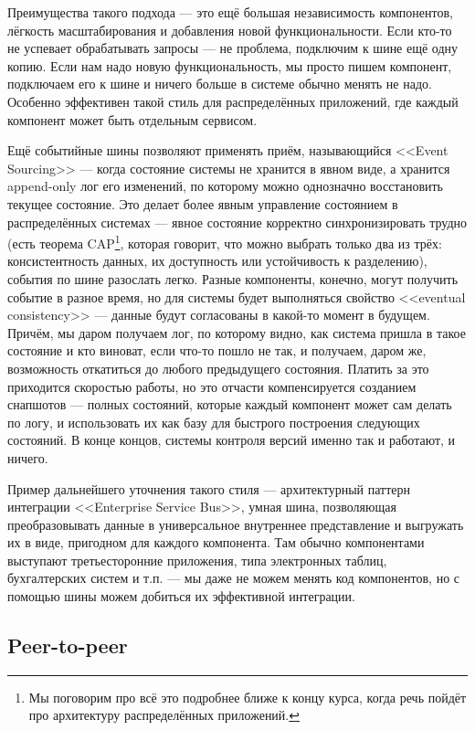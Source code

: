 \documentclass[a5paper]{article}
\begin{document}
Преимущества такого подхода --- это ещё большая независимость компонентов, лёгкость масштабирования и добавления новой функциональности. Если кто-то не успевает обрабатывать запросы --- не проблема, подключим к шине ещё одну копию. Если нам надо новую функциональность, мы просто пишем компонент, подключаем его к шине и ничего больше в системе обычно менять не надо. Особенно эффективен такой стиль для распределённых приложений, где каждый компонент может быть отдельным сервисом. 

Ещё событийные шины позволяют применять приём, называющийся <<Event Sourcing>> --- когда состояние системы не хранится в явном виде, а хранится append-only лог его изменений, по которому можно однозначно восстановить текущее состояние. Это делает более явным управление состоянием в распределённых системах --- явное состояние корректно синхронизировать трудно (есть теорема CAP\footnote{Мы поговорим про всё это подробнее ближе к концу курса, когда речь пойдёт про архитектуру распределённых приложений.}, которая говорит, что можно выбрать только два из трёх: консистентность данных, их доступность или устойчивость к разделению), события по шине разослать легко. Разные компоненты, конечно, могут получить событие в разное время, но для системы будет выполняться свойство <<eventual consistency>> --- данные будут согласованы в какой-то момент в будущем. Причём, мы даром получаем лог, по которому видно, как система пришла в такое состояние и кто виноват, если что-то пошло не так, и получаем, даром же, возможность откатиться до любого предыдущего состояния. Платить за это приходится скоростью работы, но это отчасти компенсируется созданием снапшотов --- полных состояний, которые каждый компонент может сам делать по логу, и использовать их как базу для быстрого построения следующих состояний. В конце концов, системы контроля версий именно так и работают, и ничего.

Пример дальнейшего уточнения такого стиля --- архитектурный паттерн интеграции <<Enterprise Service Bus>>, умная шина, позволяющая преобразовывать данные в универсальное внутреннее представление и выгружать их в виде, пригодном для каждого компонента. Там обычно компонентами выступают третьесторонние приложения, типа электронных таблиц, бухгалтерских систем и т.п. --- мы даже не можем менять код компонентов, но с помощью шины можем добиться их эффективной интеграции.

\subsection{Peer-to-peer}
\end{document}
